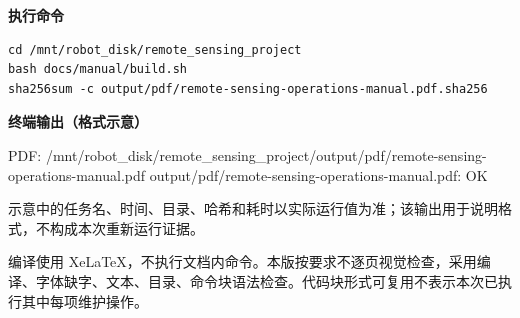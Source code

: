\documentclass[UTF8,a4paper,11pt,oneside,fontset=none]{ctexrep}
\begin{document}
\par\noindent\textbf{执行命令}\par
\begin{Verbatim}
cd /mnt/robot_disk/remote_sensing_project
bash docs/manual/build.sh
sha256sum -c output/pdf/remote-sensing-operations-manual.pdf.sha256
\end{Verbatim}
\par\noindent\textbf{终端输出（格式示意）}\par
\begin{TerminalOutput}
PDF: /mnt/robot_disk/remote_sensing_project/output/pdf/remote-sensing-operations-manual.pdf
output/pdf/remote-sensing-operations-manual.pdf: OK
\end{TerminalOutput}
示意中的任务名、时间、目录、哈希和耗时以实际运行值为准；该输出用于说明格式，不构成本次重新运行证据。

编译使用 XeLaTeX，不执行文档内命令。本版按要求不逐页视觉检查，采用编译、字体缺字、文本、目录、命令块语法检查。代码块形式可复用不表示本次已执行其中每项维护操作。
\end{document}
